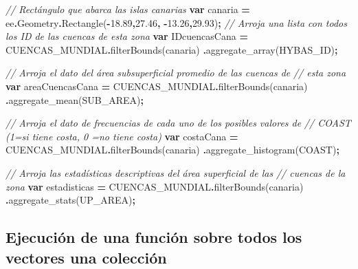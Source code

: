 \documentclass[
  12pt,
  letterpaper,
  twoside]{book}
\newenvironment{Shaded}{\begin{snugshade}}{\end{snugshade}}
\newcommand{\AttributeTok}[1]{\textcolor[rgb]{0.77,0.63,0.00}{#1}}
\newcommand{\CommentTok}[1]{\textcolor[rgb]{0.56,0.35,0.01}{\textit{#1}}}
\newcommand{\FloatTok}[1]{\textcolor[rgb]{0.00,0.00,0.81}{#1}}
\newcommand{\FunctionTok}[1]{\textcolor[rgb]{0.00,0.00,0.00}{#1}}
\newcommand{\KeywordTok}[1]{\textcolor[rgb]{0.13,0.29,0.53}{\textbf{#1}}}
\newcommand{\NormalTok}[1]{#1}
\newcommand{\OperatorTok}[1]{\textcolor[rgb]{0.81,0.36,0.00}{\textbf{#1}}}
\newcommand{\StringTok}[1]{\textcolor[rgb]{0.31,0.60,0.02}{#1}}
\begin{document}
\begin{Shaded}
\begin{Highlighting}[]
\CommentTok{// Rectángulo que abarca las islas canarias}
\KeywordTok{var}\NormalTok{ canaria }\OperatorTok{=}\NormalTok{ ee}\OperatorTok{.}\AttributeTok{Geometry}\OperatorTok{.}\FunctionTok{Rectangle}\NormalTok{(}\OperatorTok{{-}}\FloatTok{18.89}\OperatorTok{,}\FloatTok{27.46}\OperatorTok{,} \OperatorTok{{-}}\FloatTok{13.26}\OperatorTok{,}\FloatTok{29.93}\NormalTok{)}\OperatorTok{;} 
\CommentTok{// Arroja una lista con todos los ID de las cuencas de esta zona}
\KeywordTok{var}\NormalTok{ IDcuencasCana }\OperatorTok{=}\NormalTok{ CUENCAS\_MUNDIAL}\OperatorTok{.}\FunctionTok{filterBounds}\NormalTok{(canaria)}
\OperatorTok{.}\FunctionTok{aggregate\_array}\NormalTok{(}\StringTok{\textquotesingle{}HYBAS\_ID\textquotesingle{}}\NormalTok{)}\OperatorTok{;}

\CommentTok{// Arroja el dato del área subsuperficial promedio de las cuencas de }
\CommentTok{// esta zona}
\KeywordTok{var}\NormalTok{ areaCuencasCana }\OperatorTok{=}\NormalTok{ CUENCAS\_MUNDIAL}\OperatorTok{.}\FunctionTok{filterBounds}\NormalTok{(canaria)}
\OperatorTok{.}\FunctionTok{aggregate\_mean}\NormalTok{(}\StringTok{\textquotesingle{}SUB\_AREA\textquotesingle{}}\NormalTok{)}\OperatorTok{;}

\CommentTok{// Arroja el dato de frecuencias de cada uno de los posibles valores de}
\CommentTok{// COAST (1=si tiene costa, 0 =no tiene costa)}
\KeywordTok{var}\NormalTok{ costaCana }\OperatorTok{=}\NormalTok{ CUENCAS\_MUNDIAL}\OperatorTok{.}\FunctionTok{filterBounds}\NormalTok{(canaria)}
\OperatorTok{.}\FunctionTok{aggregate\_histogram}\NormalTok{(}\StringTok{\textquotesingle{}COAST\textquotesingle{}}\NormalTok{)}\OperatorTok{;} 

\CommentTok{// Arroja las estadísticas descriptivas del área superficial de las}
\CommentTok{// cuencas de la zona}
\KeywordTok{var}\NormalTok{ estadisticas }\OperatorTok{=}\NormalTok{ CUENCAS\_MUNDIAL}\OperatorTok{.}\FunctionTok{filterBounds}\NormalTok{(canaria)}
\OperatorTok{.}\FunctionTok{aggregate\_stats}\NormalTok{(}\StringTok{\textquotesingle{}UP\_AREA\textquotesingle{}}\NormalTok{)}\OperatorTok{;} 
\end{Highlighting}
\end{Shaded}

\hypertarget{ejecuciuxf3n-de-una-funciuxf3n-sobre-todos-los-vectores-una-colecciuxf3n}{%
\subsection{Ejecución de una función sobre todos los vectores una colección}\label{ejecuciuxf3n-de-una-funciuxf3n-sobre-todos-los-vectores-una-colecciuxf3n}}
\end{document}

